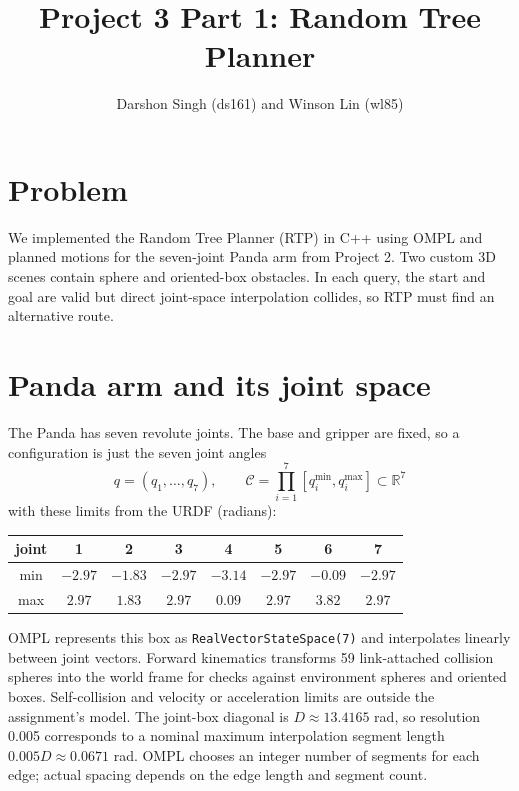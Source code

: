 \documentclass{comp450}
\title{Project 3 Part 1: Random Tree Planner}
\author{Darshon Singh (ds161) and Winson Lin (wl85)}
\begin{document}
\maketitle

\section*{Problem}

We implemented the Random Tree Planner (RTP) in C++ using OMPL and planned motions for the seven-joint Panda arm from Project 2. Two custom 3D scenes contain sphere and oriented-box obstacles. In each query, the start and goal are valid but direct joint-space interpolation collides, so RTP must find an alternative route.

\section*{Panda arm and its joint space}

The Panda has seven revolute joints. The base and gripper are fixed, so a configuration is just the seven joint angles
\[
q = (q_1, \dots, q_7), \qquad \mathcal{C} = \prod_{i=1}^{7} [q_i^{\min}, q_i^{\max}] \subset \mathbb{R}^7
\]
with these limits from the URDF (radians):

\begin{center}
\begin{tabular}{cccccccc}
\toprule
joint & 1 & 2 & 3 & 4 & 5 & 6 & 7 \\
\midrule
min & $-2.97$ & $-1.83$ & $-2.97$ & $-3.14$ & $-2.97$ & $-0.09$ & $-2.97$ \\
max & $2.97$ & $1.83$ & $2.97$ & $0.09$ & $2.97$ & $3.82$ & $2.97$ \\
\bottomrule
\end{tabular}
\end{center}

OMPL represents this box as \texttt{RealVectorStateSpace(7)} and interpolates linearly between joint vectors. Forward kinematics transforms 59 link-attached collision spheres into the world frame for checks against environment spheres and oriented boxes. Self-collision and velocity or acceleration limits are outside the assignment's model. The joint-box diagonal is $D\approx13.4165$ rad, so resolution 0.005 corresponds to a nominal maximum interpolation segment length $0.005D\approx0.0671$ rad. OMPL chooses an integer number of segments for each edge; actual spacing depends on the edge length and segment count.
\end{document}
